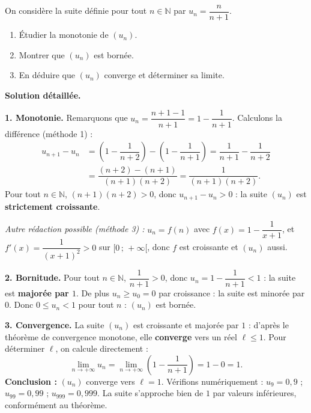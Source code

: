 \documentclass[11pt]{article}
\begin{document}
\begin{exoresolu}[Étude complète de la suite $u_n = \dfrac{n}{n+1}$]
On considère la suite définie pour tout $n \in \mathbb{N}$ par $u_n = \dfrac{n}{n+1}$.
\begin{enumerate}
\item Étudier la monotonie de $(u_n)$.
\item Montrer que $(u_n)$ est bornée.
\item En déduire que $(u_n)$ converge et déterminer sa limite.
\end{enumerate}
\tcblower
\textbf{Solution détaillée.}

\textbf{1. Monotonie.} Remarquons que $u_n = \dfrac{n+1-1}{n+1} = 1 - \dfrac{1}{n+1}$. Calculons la différence (méthode 1) :
\begin{align*}
u_{n+1} - u_n &= \left(1 - \dfrac{1}{n+2}\right) - \left(1 - \dfrac{1}{n+1}\right) = \dfrac{1}{n+1} - \dfrac{1}{n+2} \\
&= \dfrac{(n+2)-(n+1)}{(n+1)(n+2)} = \dfrac{1}{(n+1)(n+2)}.
\end{align*}
Pour tout $n \in \mathbb{N}$, $(n+1)(n+2) > 0$, donc $u_{n+1} - u_n > 0$ : la suite $(u_n)$ est \textbf{strictement croissante}.

\emph{Autre rédaction possible (méthode 3) :} $u_n = f(n)$ avec $f(x) = 1 - \dfrac{1}{x+1}$, et $f'(x) = \dfrac{1}{(x+1)^2} > 0$ sur $[0\,;\,+\infty[$, donc $f$ est croissante et $(u_n)$ aussi.

\textbf{2. Bornitude.} Pour tout $n \in \mathbb{N}$, $\dfrac{1}{n+1} > 0$, donc $u_n = 1 - \dfrac{1}{n+1} < 1$ : la suite est \textbf{majorée par $1$}. De plus $u_n \geq u_0 = 0$ par croissance : la suite est minorée par $0$. Donc $0 \leq u_n < 1$ pour tout $n$ : $(u_n)$ est bornée.

\textbf{3. Convergence.} La suite $(u_n)$ est croissante et majorée par $1$ : d'après le théorème de convergence monotone, elle \textbf{converge} vers un réel $\ell \leq 1$. Pour déterminer $\ell$, on calcule directement :
\[ \lim_{n \to +\infty} u_n = \lim_{n \to +\infty} \left(1 - \dfrac{1}{n+1}\right) = 1 - 0 = 1. \]
\textbf{Conclusion :} $(u_n)$ converge vers $\ell = 1$. Vérifions numériquement : $u_9 = 0{,}9$ ; $u_{99} = 0{,}99$ ; $u_{999} = 0{,}999$. La suite s'approche bien de $1$ par valeurs inférieures, conformément au théorème.
\end{exoresolu}
\end{document}
